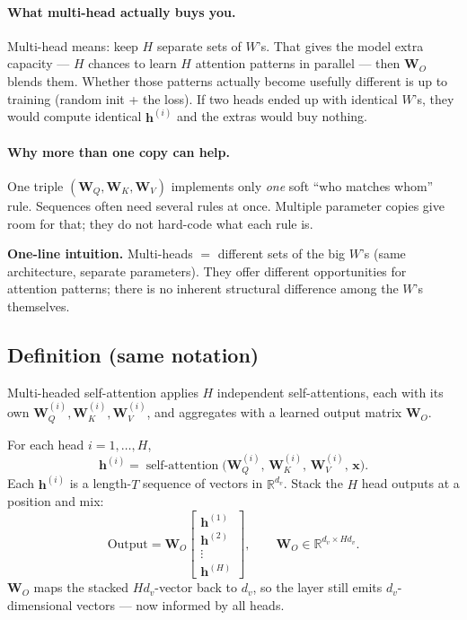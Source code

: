 \documentclass[11pt]{article}
\begin{document}
\paragraph{What multi-head actually buys you.}
Multi-head means: keep \(H\) separate sets of \(W\)'s. That gives the
model extra capacity --- \(H\) chances to learn \(H\) attention patterns
in parallel --- then \(\mathbf{W}_O\) blends them. Whether those patterns
actually become usefully different is up to training (random init + the
loss). If two heads ended up with identical \(W\)'s, they would compute
identical \(\mathbf{h}^{(i)}\) and the extras would buy nothing.

\paragraph{Why more than one copy can help.}
One triple \((\mathbf{W}_Q,\mathbf{W}_K,\mathbf{W}_V)\) implements only
\emph{one} soft ``who matches whom'' rule. Sequences often need several
rules at once. Multiple parameter copies give room for that; they do not
hard-code what each rule is.

\noindent\textbf{One-line intuition.}
Multi-heads \(=\) different sets of the big \(W\)'s (same architecture,
separate parameters). They offer different opportunities for attention
patterns; there is no inherent structural difference among the \(W\)'s
themselves.

\subsection{Definition (same notation)}

Multi-headed self-attention applies \(H\) independent self-attentions, each
with its own \(\mathbf{W}_Q^{(i)},\mathbf{W}_K^{(i)},\mathbf{W}_V^{(i)}\),
and aggregates with a learned output matrix \(\mathbf{W}_O\).

For each head \(i=1,\ldots,H\),
\[
  \mathbf{h}^{(i)}
  =
  \operatorname{self\text{-}attention}\!\bigl(
  \mathbf{W}_Q^{(i)},\,
  \mathbf{W}_K^{(i)},\,
  \mathbf{W}_V^{(i)},\,
  \mathbf{x}
  \bigr).
\]
Each \(\mathbf{h}^{(i)}\) is a length-\(T\) sequence of vectors in
\(\mathbb{R}^{d_v}\). Stack the \(H\) head outputs at a position and mix:
\[
  \text{Output}
  =
  \mathbf{W}_O
  \begin{bmatrix}
    \mathbf{h}^{(1)} \\[0.25em]
    \mathbf{h}^{(2)} \\[0.25em]
    \vdots \\[0.25em]
    \mathbf{h}^{(H)}
  \end{bmatrix},
  \qquad
  \mathbf{W}_O \in \mathbb{R}^{d_v \times H d_v}.
\]
\(\mathbf{W}_O\) maps the stacked \(H d_v\)-vector back to \(d_v\), so the
layer still emits \(d_v\)-dimensional vectors --- now informed by all heads.
\end{document}
